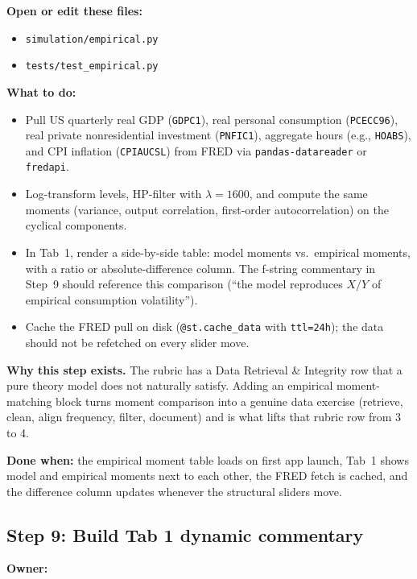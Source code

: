 \documentclass[11pt]{article}
\newcommand{\nameblank}{\underline{\hspace{4.5cm}}}
\begin{document}
\textbf{Open or edit these files:}
\begin{itemize}
    \item \texttt{simulation/empirical.py}
    \item \texttt{tests/test\_empirical.py}
\end{itemize}

\textbf{What to do:}
\begin{itemize}
    \item Pull US quarterly real GDP (\texttt{GDPC1}), real personal consumption (\texttt{PCECC96}), real private nonresidential investment (\texttt{PNFIC1}), aggregate hours (e.g., \texttt{HOABS}), and CPI inflation (\texttt{CPIAUCSL}) from FRED via \texttt{pandas-datareader} or \texttt{fredapi}.
    \item Log-transform levels, HP-filter with $\lambda=1600$, and compute the same moments (variance, output correlation, first-order autocorrelation) on the cyclical components.
    \item In Tab~1, render a side-by-side table: model moments vs.\ empirical moments, with a ratio or absolute-difference column. The f-string commentary in Step~9 should reference this comparison (``the model reproduces $X/Y$ of empirical consumption volatility'').
    \item Cache the FRED pull on disk (\texttt{@st.cache\_data} with \texttt{ttl=24h}); the data should not be refetched on every slider move.
\end{itemize}

\begin{notebox}
\textbf{Why this step exists.} The rubric has a Data Retrieval \& Integrity row that a pure theory model does not naturally satisfy. Adding an empirical moment-matching block turns moment comparison into a genuine data exercise (retrieve, clean, align frequency, filter, document) and is what lifts that rubric row from 3 to 4.
\end{notebox}

\textbf{Done when:} the empirical moment table loads on first app launch, Tab~1 shows model and empirical moments next to each other, the FRED fetch is cached, and the difference column updates whenever the structural sliders move.

\subsection{Step 9: Build Tab 1 dynamic commentary}
\textbf{Owner:} \nameblank
\end{document}
